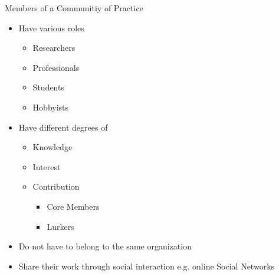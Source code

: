 \begin{frame}{Members of a Communitiy of Practice}
  \begin{itemize}
    \item Have various roles
          \begin{itemize}
            \item Researchers
            \item Professionals
            \item Students
            \item Hobbyists
          \end{itemize} %
    \item Have different degrees of
          \begin{itemize}
            \item Knowledge %
            \item Interest %
            \item Contribution
                  \begin{itemize}
                    \item Core Members %
                    \item Lurkers %
                  \end{itemize}
          \end{itemize}
    \item Do not have to belong to the same organization
    \item Share their work through social interaction e.g. online Social Networks %

  \end{itemize}
\end{frame}


